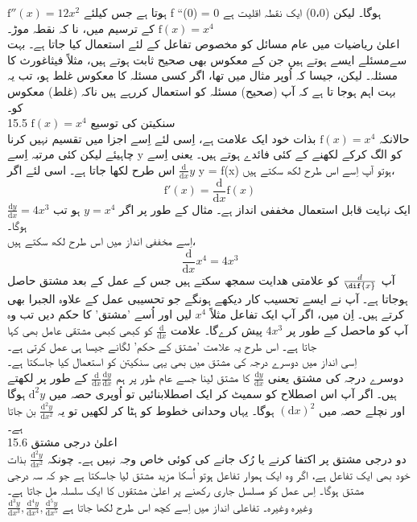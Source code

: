 \( \text{f}''(x) = 12x^{2} \)
	  ہوتا ہے جس کیلئے f ``(0) = 0  ہوگا۔ لیکن (0،0) ایک نقطہ اقلیت ہے
\( \text{f}(x) = x^{4 }\)
	  کے ترسیم میں، نا کہ نقطہ موڑ۔\\
اعلیٰ ریاضیات  میں عام مسائل  کو مخصوص تفاعل کے لئے استعمال کیا جاتا ہے۔ بہت سےمسئلے ایسے ہوتے ہیں جن کے معکوس بھی صحیح ثابت ہوتے ہیں، مثلاً فیثاغورث کا مسئلہ۔ لیکن، جیسا کہ اُوپر مثال میں تھا، اگر کسی مسئلہ کا معکوس غلط ہو، تب یہ بہت اہم ہوجا تا ہے کہ آپ (صحیح) مسئلہ کو استعمال کررہے ہیں ناکہ (غلط) معکوس کو۔ \\
15.5 \( \text{f}(x) = x^4 \)
 سنکیتن  کی توسیع\\
	حالانکہ 
\( \text{f}(x) = x^4 \)
	 بذات خود ایک علامت ہے، اِسی لئے اِسے اجزا میں تقسیم نہیں کرنا چاہیئے لیکن کئی مرتبہ اِسے y کو الگ کرکے لکھنے کے کئی فائدے ہوتے ہیں۔ یعنی اِسے 
\( \frac{\text{d}}{\text{d}x}y \)
	  اس طرح لکھا جاتا ہے۔ اسی لئے اگر  y = f(x) ہوتو آپ اِسے اس طرح لکھ سکتے ہیں،\\
\[ \text{f}'(x) = \frac{\text{d}}{\text{d}x}\text{f}(x) \]
ایک نہایت قابل استعمال مخففی انداز ہے۔ مثال کے طور پر اگر 
\( y = x^{4 }\)
  ہو تب
\( \frac{\text{d}y}{\text{d}x} = 4x^3 \)
    ہوگا۔ \\
اِسے مخففی انداز میں اس طرح لکھ سکتے ہیں، 
\[ \frac{\text{d}}{\text{d}x}x^4 = 4x^3 \]
آپ
\(\frac{d}{\dif{x}}\)
کو علامتی ھدایت  سمجھ سکتے ہیں جس کے عمل کے بعد مشتق حاصل ہوجاتا ہے۔ آپ نے ایسے تحسیب کار دیکھے ہونگے جو تحسیبی عمل کے علاوہ الجبرا بھی کرتے ہیں۔ اِن میں، اگر آپ ایک تفاعل مثلاً
\( x^{4} \)
لیں اور اُسے 'مشتق' کا حکم  دیں تب وہ آپ کو ماحصل کے طور پر 
\( 4x^{3} \)
پیش کرےگا۔ علامت
\( \frac{\text{d}}{\text{d}x} \)
 کو کبھی کبھی مشتقی عامل  بھی کہا جاتا ہے۔ اس طرح یہ علامت 'مشتق کے حکم' لگانے جیسا ہی عمل کرتی ہے۔ \\
	اِسی انداز میں دوسرے درجہ کی مشتق میں بھی یہی سنکیتن کو استعمال کیا جاسکتا ہے۔ \\
دوسرے درجہ کی مشتق یعنی
\( \frac{\text{d}y}{\text{d}x} \)
 کا مشتق لینا جسے عام طور پر ہم
\( \frac{\text{d}}{\text{d}x}\frac{\text{d}y}{\text{d}x} \)
 کے طور پر لکھتے ہیں۔ اگر آپ اس اصطلاح کو سمیٹ کر ایک اصطلابنائیں تو اُوپری حصہ میں
\( \text{d}^2y \)
   ہوگا اور نچلے حصہ میں 
\( (\text{d}x)^2 \)
   ہوگا۔  یہاں وحدانی خطوط کو ہٹا کر لکھیں تو یہ 
\( \frac{\text{d}^2y}{\text{d}x^2} \)
    بن جاتا ہے۔ \\
15.6 اعلیٰ درجی مشتق\\
	دو درجی مشتق پر اکتفا کرنے یا رُک جانے کی کوئی خاص وجہ نہیں ہے۔ چونکہ 
\( \frac{\text{d}^2y}{\text{d}x^2} \)
	 بذات خود بھی ایک تفاعل ہے، اگر وہ ایک ہموار تفاعل ہوتو اُسکا مزید مشتق لیا جاسکتا ہے جو کہ سہ درجی مشتق ہوگا۔ اِس عمل کو مسلسل جاری رکھنے پر اعلیٰ مشتقوں کا ایک سلسلہ مل جاتا ہے۔\\
	 \( \frac{\text{d}^{3}y}{\text{d}x^{3}},\frac{\text{d}^{4}y}{\text{d}x^{4}},\frac{\text{d}^{5}y}{\text{d}x^{5}}\)
	   وغیرہ وغیرہ۔ تفاعلی انداز میں اِسے کچھ اس طرح لکھا جاتا ہے

